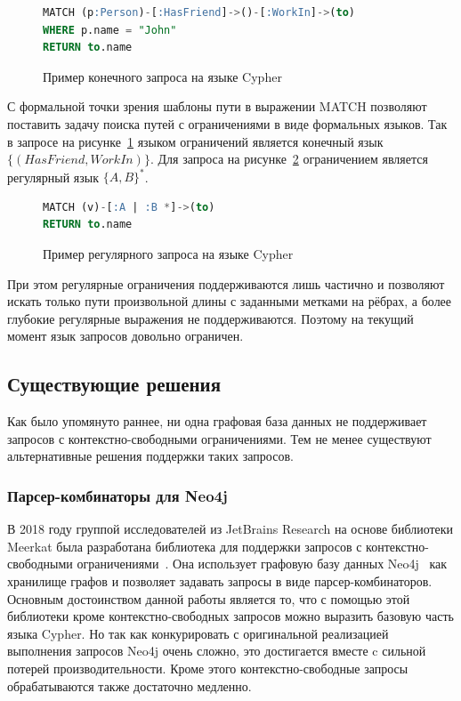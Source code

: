 
\begin{figure}[h]
\begin{lstlisting}[language=sql]
MATCH (p:Person)-[:HasFriend]->()-[:WorkIn]->(to)
WHERE p.name = "John"
RETURN to.name
\end{lstlisting}
\caption{Пример конечного запроса на языке Cypher}
\label{code:cypher_query}
\end{figure}

С формальной точки зрения шаблоны пути в выражении MATCH позволяют поставить задачу поиска путей с ограничениями в виде формальных языков. Так в запросе на рисунке~\ref{code:cypher_query} языком ограничений является конечный язык $\{(HasFriend, WorkIn)\}$. Для запроса на рисунке~\ref{code:cypher_query_2} ограничением является регулярный язык $\{A, B\}^*$. 

\begin{figure}[h]
\begin{lstlisting}[language=sql]
MATCH (v)-[:A | :B *]->(to)
RETURN to.name
\end{lstlisting}
\caption{Пример регулярного запроса на языке Cypher}
\label{code:cypher_query_2}
\end{figure}

При этом регулярные ограничения поддерживаются лишь частично и позволяют искать только пути произвольной длины с заданными метками на рёбрах, а более глубокие регулярные выражения не поддерживаются. Поэтому на текущий момент язык запросов довольно ограничен.

\subsection{Существующие решения}
Как было упомянуто раннее, ни одна графовая база данных не поддерживает запросов с контекстно-свободными ограничениями. Тем не менее существуют альтернативные решения поддержки таких запросов. 

\subsubsection{Парсер-комбинаторы для Neo4j}\label{sec:pareser-combinators}
В 2018 году группой исследователей из JetBrains Research на основе библиотеки Meerkat была разработана библиотека для поддержки запросов с контекстно-свободными ограничениями~\cite{parser-combinators}. Она использует графовую базу данных Neo4j~\cite{neo4j} как хранилище графов и позволяет задавать запросы в виде парсер-комбинаторов. Основным достоинством данной работы является то, что с помощью этой библиотеки кроме контекстно-свободных запросов можно выразить базовую часть языка Cypher. Но так как конкурировать с оригинальной реализацией выполнения запросов Neo4j очень сложно, это достигается вместе c сильной потерей производительности. Кроме этого контекстно-свободные запросы обрабатываются также достаточно медленно.

